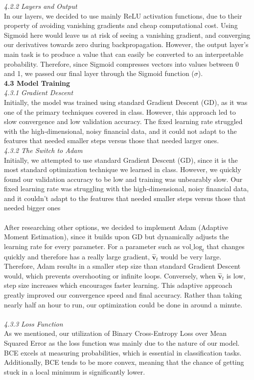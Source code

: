 \documentclass[letterpaper,12pt, twocolumn]{report}
\begin{document}
\noindent
\textit{4.2.2 Layers and Output}\\
In our layers, we decided to use mainly ReLU activation functions, due to their property of avoiding vanishing gradients and cheap computational cost. Using Sigmoid here would leave us at risk of seeing a vanishing gradient, and converging our derivatives towards zero during backpropagation. However, the output layer’s main task is to produce a value that can easily be converted to an interpretable probability. Therefore, since Sigmoid compresses vectors into values between 0 and 1, we passed our final layer through the Sigmoid function ($\sigma$). \\

\noindent
\textbf{4.3 Model Training}\\
\textit{4.3.1 Gradient Descent}\\
Initially, the model was trained using standard Gradient Descent (GD), as it was one of the primary techniques covered in class. However, this approach led to slow convergence and low validation accuracy. The fixed learning rate struggled with the high-dimensional, noisy financial data, and it could not adapt to the features that needed smaller steps versus those that needed larger ones. \\

\noindent
\textit{4.3.2 The Switch to Adam}\\
Initially, we attempted to use standard Gradient Descent (GD), since it is the most standard optimization technique we learned in class. However, we quickly found our validation accuracy to be low and training was unbearably slow. Our fixed learning rate was struggling with the high-dimensional, noisy financial data, and it couldn’t adapt to the features that needed smaller steps versus those that needed bigger ones\\\\
After researching other options, we decided to implement Adam (Adaptive Moment Estimation), since it builds upon GD but dynamically adjusts the learning rate for every parameter. For a parameter such as $\text{vol\_log}_t$ that changes quickly and therefore has a really large gradient, $\hat{\mathbf{v}}_t$ would be very large. Therefore, Adam results in a smaller step size than standard Gradient Descent would, which prevents overshooting or infinite loops. Conversely, when $\hat{\mathbf{v}}_t$ is low, step size increases which encourages faster learning. This adaptive approach greatly improved our convergence speed and final accuracy. Rather than taking nearly half an hour to run, our optimization could be done in around a minute.\\\\
\noindent
\textit{4.3.3 Loss Function}\\
As we mentioned, our utilization of Binary Cross-Entropy Loss over Mean Squared Error as the loss function was mainly due to the nature of our model. BCE excels at measuring probabilities, which is essential in classification tasks. Additionally, BCE tends to be more convex, meaning that the chance of getting stuck in a local minimum is significantly lower.\\
\end{document}
